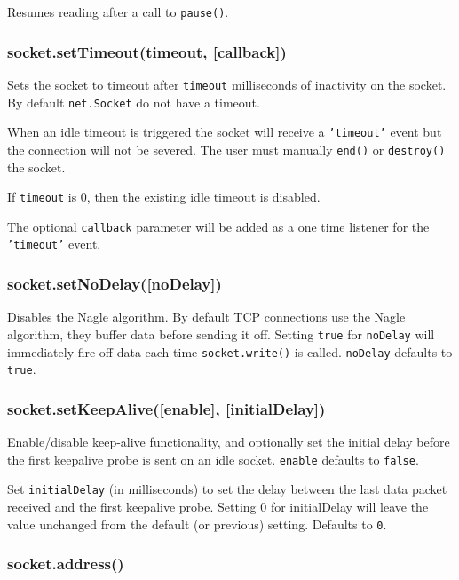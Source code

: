 Resumes reading after a call to \texttt{pause()}.

\subsubsection{socket.setTimeout(timeout, {[}callback{]})}

Sets the socket to timeout after \texttt{timeout} milliseconds of
inactivity on the socket. By default \texttt{net.Socket} do not have a
timeout.

When an idle timeout is triggered the socket will receive a
\texttt{'timeout'} event but the connection will not be severed. The
user must manually \texttt{end()} or \texttt{destroy()} the socket.

If \texttt{timeout} is 0, then the existing idle timeout is disabled.

The optional \texttt{callback} parameter will be added as a one time
listener for the \texttt{'timeout'} event.

\subsubsection{socket.setNoDelay({[}noDelay{]})}

Disables the Nagle algorithm. By default TCP connections use the Nagle
algorithm, they buffer data before sending it off. Setting \texttt{true}
for \texttt{noDelay} will immediately fire off data each time
\texttt{socket.write()} is called. \texttt{noDelay} defaults to
\texttt{true}.

\subsubsection{socket.setKeepAlive({[}enable{]}, {[}initialDelay{]})}

Enable/disable keep-alive functionality, and optionally set the initial
delay before the first keepalive probe is sent on an idle socket.
\texttt{enable} defaults to \texttt{false}.

Set \texttt{initialDelay} (in milliseconds) to set the delay between the
last data packet received and the first keepalive probe. Setting 0 for
initialDelay will leave the value unchanged from the default (or
previous) setting. Defaults to \texttt{0}.

\subsubsection{socket.address()}

